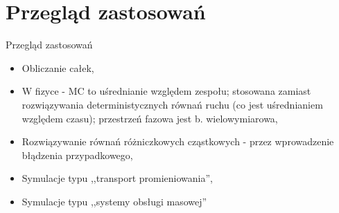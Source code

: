 \section{Przegląd zastosowań}
\begin{frame}{Przegląd zastosowań}
	\begin{itemize}
		\item Obliczanie całek,
        \item W fizyce - MC to uśrednianie względem zespołu; stosowana zamiast rozwiązywania deterministycznych równań ruchu (co jest uśrednianiem względem czasu); przestrzeń fazowa jest b. wielowymiarowa,
        \item Rozwiązywanie równań różniczkowych cząstkowych - przez wprowadzenie błądzenia przypadkowego,
        \item Symulacje typu ,,transport promieniowania'',
        \item Symulacje typu ,,systemy obsługi masowej''
	\end{itemize}
\end{frame}